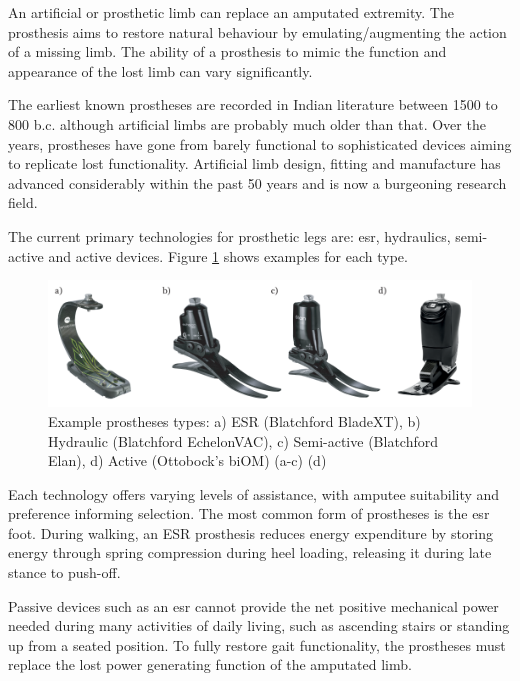 An artificial or prosthetic limb can replace an amputated extremity. The prosthesis aims to restore natural behaviour by emulating/augmenting the action of a missing limb.\cite{Tucker2015} The ability of a prosthesis to mimic the function and appearance of the lost limb can vary significantly.

The earliest known prostheses are recorded in Indian literature between 1500 to 800 b.c. although artificial limbs are probably much older than that\cite{Breakey1976}. Over the years, prostheses have gone from barely functional to sophisticated devices aiming to replicate lost functionality. Artificial limb design, fitting and manufacture has advanced considerably within the past 50 years and is now a burgeoning research field.\cite{Kirkup2007}

The current primary technologies for prosthetic legs are: \acrfull{esr}, hydraulics, semi-active and active devices\cite{Asif2021}. Figure \ref{Fig:CH2-prostheses_type} shows examples for each type.

\begin{figure}[!hbt]
    \centering
    \includegraphics[width=\textwidth]{content/2-Background/ch2_prosthetic_device_types.png}
    \caption[Example prostheses types]{Example prostheses types: a) ESR (Blatchford BladeXT), b) Hydraulic (Blatchford EchelonVAC), c) Semi-active (Blatchford Elan), d) Active (Ottobock's biOM) (a-c)\cite{blatchford2018} (d)\cite{biom2018} }
    \label{Fig:CH2-prostheses_type}
\end{figure}

Each technology offers varying levels of assistance, with amputee suitability and preference informing selection. The most common form of prostheses is the \acrshort{esr} foot. During walking, an ESR prosthesis reduces energy expenditure by storing energy through spring compression during heel loading, releasing it during late stance to push-off.\cite{Asif2021}

Passive devices such as an \acrshort{esr} cannot provide the net positive mechanical power needed during many activities of daily living, such as ascending stairs or standing up from a seated position\cite{Simon2013}. To fully restore gait functionality, the prostheses must replace the lost power generating function of the amputated limb.

